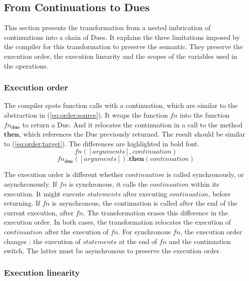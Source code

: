 \subsection{From Continuations to Dues} \label{chapter5:due:equivalence}

This section presents the transformation from a nested imbrication of continuations into a chain of Dues.
It explains the three limitations imposed by the compiler for this transformation to preserve the semantic.
They preserve the execution order, the execution linearity and the scopes of the variables used in the operations.

\subsubsection{Execution order}

The compiler spots function calls with a continuation, which are similar to the abstraction in (\ref{eq:order:source}).
It wraps the function $fn$ into the function $fn_\textbf{due}$ to return a Due.
And it relocates the continuation in a call to the method $\textbf{then}$, which references the Due previously returned.
The result should be similar to (\ref{eq:order:target}).
The differences are highlighted in bold font.
\begin{equation} \label{eq:order:source}
fn([arguments], continuation)
\end{equation}
\begin{equation} \label{eq:order:target}
fn_\textbf{due}([arguments])\textbf{.then}(continuation)
\end{equation}

The execution order is different whether $continuation$ is called synchronously, or asynchronously.
If $fn$ is synchronous, it calls the $continuation$ within its execution.
It might execute $statements$ after executing $continuation$, before returning.
If $fn$ is asynchronous, the continuation is called after the end of the current execution, after $fn$.
The transformation erases this difference in the execution order.
In both cases, the transformation relocates the execution of $continuation$ after the execution of $fn$.
For synchronous $fn$, the execution order changes ; the execution of $statements$ at the end of $fn$ and the continuation switch.
The latter must be asynchronous to preserve the execution order.

\subsubsection{Execution linearity}

